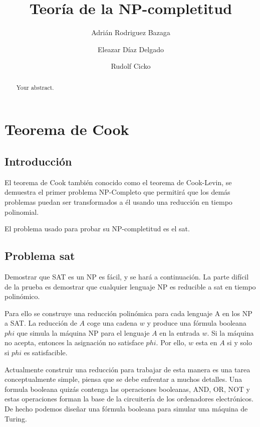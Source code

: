 \documentclass[a4paper, spanish, utf8]{memoir}
\title{\Huge Teoría de la NP-completitud}
\author{Adrián Rodriguez Bazaga}
\author{Eleazar Díaz Delgado}
\author{Rudolf Cicko}
\affil{Universidad de La Laguna}
\begin{document}
\maketitle

\begin{abstract}
Your abstract.
\end{abstract}

\chapter{Teorema de Cook}

\section{Introducción}

El teorema de Cook también conocido como el teorema de Cook-Levin, se demuestra
el primer problema NP-Completo que permitirá que los demás problemas puedan ser
transformados a él usando una reducción en tiempo polinomial.

El problema usado para probar su NP-completitud es el \gls{sat}.

\section{Problema \gls{sat}}

Demostrar que SAT es un NP es fácil, y se hará a continuación. La parte difícil de la prueba es demostrar  que cualquier lenguaje NP es reducible a \gls{sat} en tiempo polinómico.	

Para ello se construye una reducción polinómica para cada lenguaje A en los NP a SAT. La reducción de $A$ coge una cadena $w$ y produce una fórmula booleana $phi$ que simula la máquina NP para el lenguaje $A$ en la entrada $w$. Si la máquina no acepta, entonces la asignación no satisface $phi$. Por ello, $w$ esta en $A$ si y solo si $phi$ es satisfacible.

Actualmente construir una reducción para trabajar de esta manera es una tarea conceptualmente simple, piensa que se debe enfrentar a muchos detalles. Una formula booleana quizás contenga las operaciones booleanas, AND, OR, NOT y estas operaciones forman la base de la circuitería de los ordenadores electrónicos. De hecho podemos diseñar una fórmula booleana para simular una máquina de Turing.
\end{document}
